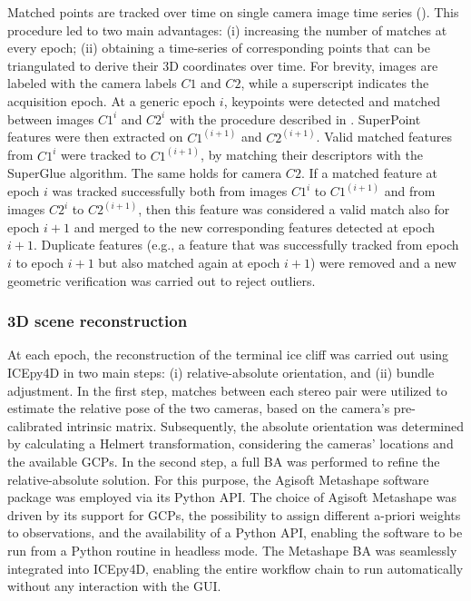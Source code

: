 Matched points are tracked over time on single camera image time series
().
This procedure led to two main advantages: (i) increasing the number of matches
at every epoch; (ii) obtaining a time-series of corresponding points that can be
triangulated to derive their 3D coordinates over time.
For brevity, images are labeled with the camera labels \(C1\) and \(C2\), while a
superscript indicates the acquisition epoch.
At a generic epoch \(i\), keypoints were detected and
matched between images \(C1^i\) and \(C2^i\) with the procedure described
in .
SuperPoint features were then extracted on \(C1^{(i+1)}\) and \(C2^{(i+1)}\).
Valid matched features from \(C1^i\) were tracked to \(C1^{(i+1)}\), by matching their
descriptors with the SuperGlue algorithm.
The same holds for camera \(C2\).
If a matched feature at epoch \(i\) was tracked successfully both from images
\(C1^i\) to \(C1^{(i+1)}\) and from images \(C2^i\) to \(C2^{(i+1)}\), then this feature
was considered a valid match also for epoch \(i+1\) and merged to the new corresponding
features detected at epoch \(i+1\).
Duplicate features (e.g., a feature that was successfully tracked from epoch \(i\) to
epoch \(i+1\) but also matched again at epoch \(i+1\)) were removed and a new geometric
verification was carried out to reject outliers.

\subsubsection{3D scene reconstruction}\label{sec:4:3dreconstruction}

At each epoch, the reconstruction of the terminal ice cliff was carried out using ICEpy4D
in two main steps: (i) relative-absolute orientation, and (ii) bundle adjustment.
In the first step, matches between each stereo pair were utilized to estimate the
relative pose of the two cameras, based on the camera's pre-calibrated intrinsic matrix.
Subsequently, the absolute orientation was determined by calculating a Helmert
transformation, considering the cameras' locations and the available GCPs.
In the second step, a full BA was performed to refine the relative-absolute solution. For this purpose, the Agisoft Metashape software package was employed via its Python API.
The choice of Agisoft Metashape was driven by its support for GCPs, the possibility to
assign different a-priori weights to observations, and the availability of a Python API,
enabling the software to be run from a Python routine in headless mode.
The Metashape BA was seamlessly integrated into ICEpy4D, enabling the entire workflow
chain to run automatically without any interaction with the GUI.

